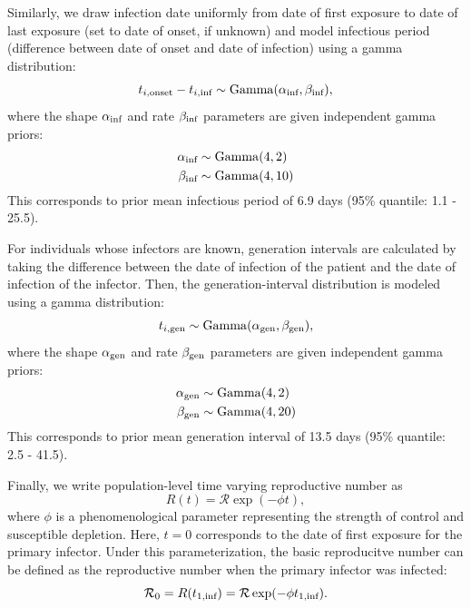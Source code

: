 \documentclass[12pt]{article}
\begin{document}
Similarly, we draw infection date uniformly from date of first exposure to date of last exposure (set to date of onset, if unknown) and model infectious period (difference between date of onset and date of infection) using a gamma distribution:
\begin{equation}
t_{i, \tiny{\textrm{onset}}} - t_{i, \tiny{\textrm{inf}}} \sim \mathrm{Gamma}(\alpha_{\tiny{\textrm{inf}}}, \beta_{\tiny{\textrm{inf}}}),
\end{equation}
where the shape $\alpha_{\tiny{\textrm{inf}}}$ and rate $\beta_{\tiny{\textrm{inf}}}$ parameters are given independent gamma priors:
\begin{equation}
\begin{aligned}
\alpha_{\tiny{\textrm{inf}}} &\sim \mathrm{Gamma}(4, 2)\\
\beta_{\tiny{\textrm{inf}}} &\sim \mathrm{Gamma}(4, 10)\\
\end{aligned}
\end{equation}
This corresponds to prior mean infectious period of 6.9 days (95\% quantile: 1.1 - 25.5).

For individuals whose infectors are known, generation intervals are calculated by taking the difference between the date of infection of the patient and the date of infection of the infector.
Then, the generation-interval distribution is modeled using a gamma distribution:
\begin{equation}
t_{i, \tiny{\textrm{gen}}} \sim \mathrm{Gamma}(\alpha_{\tiny{\textrm{gen}}}, \beta_{\tiny{\textrm{gen}}}),
\end{equation}
where the shape $\alpha_{\tiny{\textrm{gen}}}$ and rate $\beta_{\tiny{\textrm{gen}}}$ parameters are given independent gamma priors:
\begin{equation}
\begin{aligned}
\alpha_{\tiny{\textrm{gen}}} &\sim \mathrm{Gamma}(4, 2)\\
\beta_{\tiny{\textrm{gen}}} &\sim \mathrm{Gamma}(4, 20)\\
\end{aligned}
\end{equation}
This corresponds to prior mean generation interval of 13.5 days (95\% quantile: 2.5 - 41.5).

Finally, we write population-level time varying reproductive number as 
\begin{equation}
R(t) = \mathcal R \exp(- \phi t),
\end{equation}
where $\phi$ is a phenomenological parameter representing the strength of control and susceptible depletion.
Here, $t = 0$ corresponds to the date of first exposure for the primary infector.
Under this parameterization, the basic reproducitve number can be defined as the reproductive number when the primary infector was infected:
\begin{equation}
\mathcal R_0 = R(t_{1, \tiny{\textrm{inf}}}) =  \mathcal R \exp(- \phi t_{1, \tiny{\textrm{inf}}}).
\end{equation} 
\end{document}
